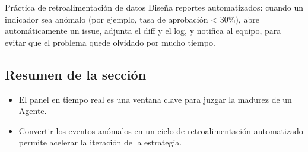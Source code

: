 \begin{importantbox}{Práctica de retroalimentación de datos}
Diseña reportes automatizados: cuando un indicador sea anómalo (por ejemplo, tasa de aprobación < 30\%), abre automáticamente un issue, adjunta el diff y el log, y notifica al equipo, para evitar que el problema quede olvidado por mucho tiempo.
\end{importantbox}

\subsection{Resumen de la sección}
\begin{itemize}
    \item El panel en tiempo real es una ventana clave para juzgar la madurez de un Agente.
    \item Convertir los eventos anómalos en un ciclo de retroalimentación automatizado permite acelerar la iteración de la estrategia.
\end{itemize}

